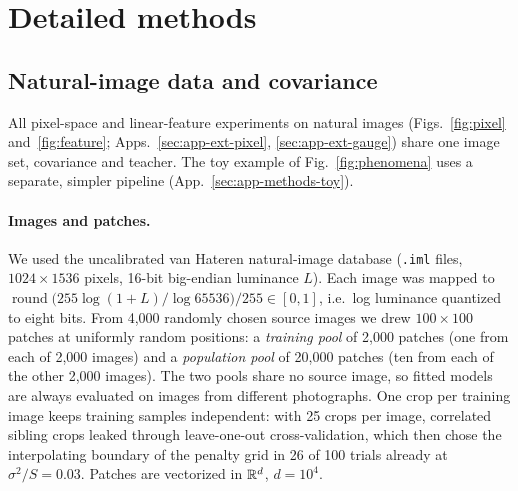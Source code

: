 
\section{Detailed methods}
\label{sec:app-methods}

\subsection{Natural-image data and covariance}
\label{sec:app-methods-images}
All pixel-space and linear-feature experiments on natural images (Figs.~\ref{fig:pixel}
and~\ref{fig:feature}; Apps.~\ref{sec:app-ext-pixel}, \ref{sec:app-ext-gauge})
share one image set, covariance and teacher.  The toy example of
Fig.~\ref{fig:phenomena} uses a separate, simpler pipeline
(App.~\ref{sec:app-methods-toy}).

\paragraph{Images and patches.}
We used the uncalibrated van Hateren natural-image database (\texttt{.iml}
files, $1024\times1536$ pixels, 16-bit big-endian luminance $L$).  Each image
was mapped to $\operatorname{round}\!\big(255\log(1+L)/\log 65536\big)/255\in[0,1]$,
i.e.\ log luminance quantized to eight bits.  From 4,000 randomly chosen
source images we drew $100\times100$ patches at uniformly random positions: a
\emph{training pool} of 2,000 patches (one from each of 2,000 images) and a
\emph{population pool} of 20,000 patches (ten from each of the other 2,000
images).  The two pools share no source image, so fitted models are always
evaluated on images from different photographs.  One crop per training image
keeps training samples independent: with 25 crops per image, correlated
sibling crops leaked through leave-one-out cross-validation, which then chose
the interpolating boundary of the penalty grid in 26 of 100 trials already
at $\sigma^2/S=0.03$.  Patches are vectorized in $\mathbb{R}^{d}$, $d=10^4$.

